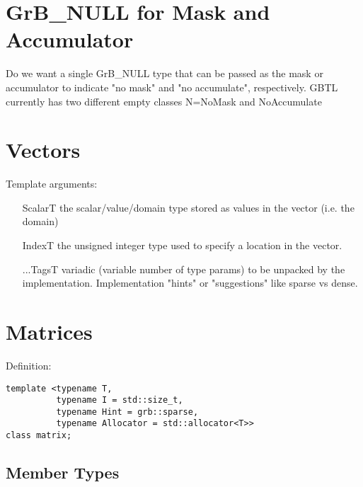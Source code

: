 \section{{\sf GrB\_NULL} for Mask and Accumulator}
\label{Sec:NoMaskNoAccum}

Do we want a single {\sf GrB\_NULL} type that can be passed as the mask or accumulator 
to indicate "no mask" and "no accumulate", respectively.  GBTL currently has two
different empty classes N={\sf NoMask} and {\sf NoAccumulate}

\section{Vectors}
\label{Sec:Vectors}

Template arguments:
\begin{itemize}[leftmargin=1.1in]
\item[ScalarT]  the scalar/value/domain type stored as values in the vector (i.e. the domain)
\item[IndexT]   the unsigned integer type used to specify a location in the vector.
\item[...TagsT] variadic (variable number of type params) to be unpacked by the implementation.
Implementation "hints" or "suggestions" like sparse vs dense.
\end{itemize}

\section{Matrices}
\label{Sec:Matrices}

Definition:

\begin{verbatim}
template <typename T,
          typename I = std::size_t,
          typename Hint = grb::sparse,
          typename Allocator = std::allocator<T>>
class matrix;
\end{verbatim}

\subsection{Member Types}

